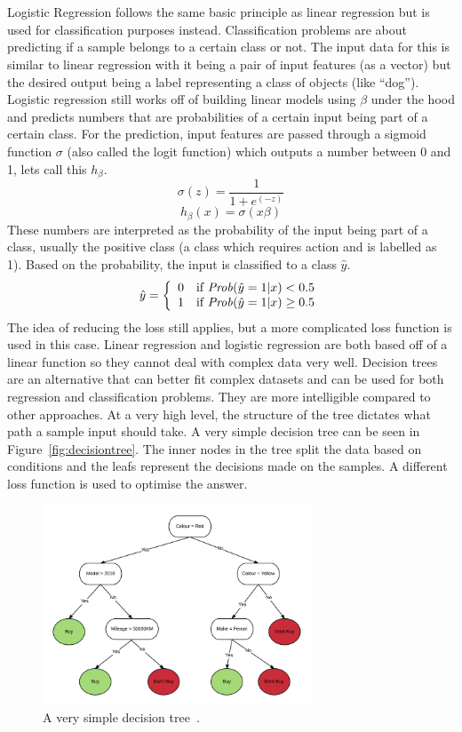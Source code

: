 \documentclass[12pt]{article}
\begin{document}
\\\\
Logistic Regression follows the same basic principle as linear regression but is used for classification purposes instead. Classification problems are about predicting if a sample belongs to a certain class or not. The input data for this is similar to linear regression with it being a pair of input features (as a vector) but the desired output being a label representing a class of objects (like ``dog''). Logistic regression still works off of building linear models using $\beta$ under the hood and predicts numbers that are probabilities of a certain input being part of a certain class. For the prediction, input features are passed through a sigmoid function $\sigma$ (also called the logit function) which outputs a number between 0 and 1, lets call this $h_\beta$. 
$$\sigma(z) = \frac{1}{1 + e^{(-z)}}$$
$$h_\beta(x) = \sigma(x\beta)$$
These numbers are interpreted as the probability of the input being part of a class, usually the positive class (a class which requires action and is labelled as 1). Based on the probability, the input is classified to a class $\hat{y}$.
$$\hat{y} = \left\{ 
    \begin{array}{ll} 
      0 & \mbox{if \textit{Prob}}(\hat{y} = 1 | x) < 0.5 \\
      1 & \mbox{if \textit{Prob}}(\hat{y} = 1 | x) \geq 0.5
    \end{array}
  \right.
$$
The idea of reducing the loss still applies, but a more complicated loss function is used in this case. Linear regression and logistic regression are both based off of a linear function so they cannot deal with complex data very well. Decision trees are an alternative that can better fit complex datasets and can be used for both regression and classification problems. They are more intelligible compared to other approaches. At a very high level, the structure of the tree dictates what path a sample input should take. A very simple decision tree can be seen in Figure~\ref{fig:decisiontree}. The inner nodes in the tree split the data based on conditions and the leafs represent the decisions made on the samples. A different loss function is used to optimise the answer.
\begin{figure}[H]
	\centering
	\includegraphics[width=8cm]{resources/decisiontree.png}
	\caption{A very simple decision tree~\cite{phdthesis}.}
\end{figure}\label{fig:decisiontree}
\end{document}
